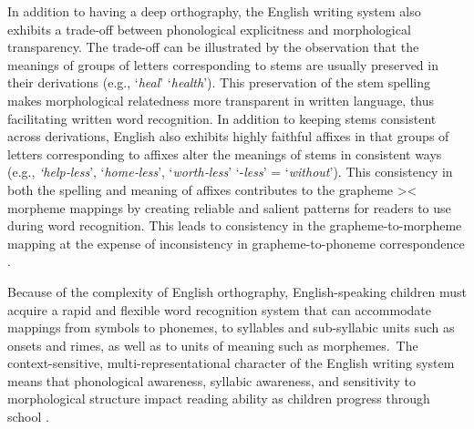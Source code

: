 \documentclass[review]{elsarticle}
\begin{document}
In addition to having a deep orthography, the English writing system also exhibits a trade-off between phonological explicitness and morphological transparency. The trade-off can be illustrated by the observation that the meanings of groups of letters corresponding to stems are usually preserved in their derivations (e.g., ‘\textit{heal}’ \textrightarrow ‘\textit{health}’). This preservation of the stem spelling makes morphological relatedness more transparent in written language, thus facilitating written word recognition. In addition to keeping stems consistent across derivations, English also exhibits highly faithful affixes in that groups of letters corresponding to affixes alter the meanings of stems in consistent ways (e.g., \textit{‘help‑less}’, ‘\textit{home‑less}’, ‘\textit{worth‑less}’ \textrightarrow ‘‑\textit{less}’ = ‘\textit{without}’). This consistency in both the spelling and meaning of affixes contributes to the grapheme >< morpheme mappings by creating reliable and salient patterns for readers to use during word recognition. This leads to consistency in the grapheme-to-morpheme mapping at the expense of inconsistency in grapheme-to-phoneme correspondence \citep{zieglerReadingAcquisitionDevelopmental2005,rastlePlaceMorphologyLearning2019}. %


Because of the complexity of English orthography, English-speaking children must acquire a rapid and flexible word recognition system that can accommodate mappings from symbols to phonemes, to syllables and sub-syllabic units such as onsets and rimes, as well as to units of meaning such as morphemes. The context-sensitive, multi-representational character of the English writing system means that  phonological awareness, syllabic awareness, and sensitivity to morphological structure impact reading ability as children progress through school \citep{mahonyReadingAbilitySensitivity2000}.  
\end{document}

